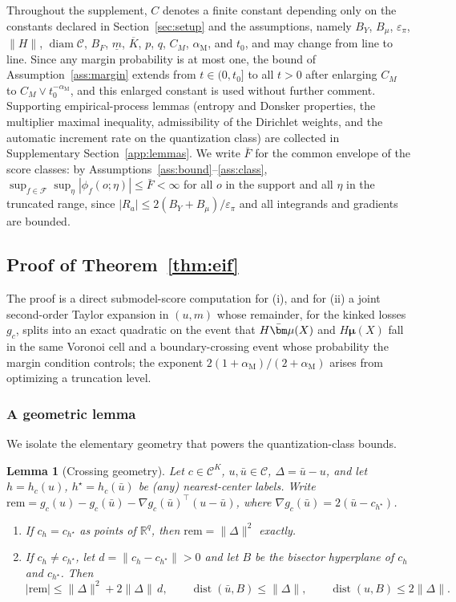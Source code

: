 \documentclass[11pt]{article}
\newtheorem{lemma}{Lemma}
\newcommand{\R}{\mathbb R}
\newcommand{\dist}{\operatorname{dist}}
\newcommand{\diam}{\operatorname{diam}}
\newcommand{\calC}{\mathcal C}
\newcommand{\calF}{\mathcal F}
\newcommand{\bmu}{\bm\mu}
\newcommand{\eps}{\varepsilon}
\newcommand{\norm}[1]{\lVert #1\rVert}
\newcommand{\am}{\alpha_{\mathrm M}}
\begin{document}
Throughout the supplement, $C$ denotes a finite constant depending only on the constants declared in Section~\ref{sec:setup} and the assumptions, namely $B_Y$, $B_\mu$, $\eps_\pi$, $\norm{H}$, $\diam\calC$, $B_F$, $\underline m$, $\overline K$, $p$, $q$, $C_M$, $\am$, and $t_0$, and may change from line to line. Since any margin probability is at most one, the bound of Assumption~\ref{ass:margin} extends from $t\in(0,t_0]$ to all $t>0$ after enlarging $C_M$ to $C_M\vee t_0^{-\am}$, and this enlarged constant is used without further comment. 
Supporting empirical-process lemmas (entropy and Donsker properties, the multiplier maximal inequality, admissibility of the Dirichlet weights, and the automatic increment rate on the quantization class) are collected in Supplementary Section~\ref{app:lemmas}. 
We write $\bar F$ for the common envelope of the score classes: by Assumptions~\ref{ass:bound}--\ref{ass:class}, $\sup_{f\in\calF}\sup_\eta|\phi_f(o;\eta)|\le\bar F<\infty$ for all $o$ in the support and all $\eta$ in the truncated range, since $|R_a|\le2(B_Y+B_\mu)/\eps_\pi$ and all integrands and gradients are bounded.

\subsection{Proof of Theorem~\ref{thm:eif}}\label{app:eif}
The proof is a direct submodel-score computation for (i), and for (ii) a joint second-order Taylor expansion in $(u,m)$ whose remainder, for the kinked losses $g_c$, splits into an exact quadratic on the event that $H\bar\bmu(X)$ and $H\bmu(X)$ fall in the same Voronoi cell and a boundary-crossing event whose probability the margin condition controls; the exponent $2(1+\am)/(2+\am)$ arises from optimizing a truncation level.
\subsubsection{A geometric lemma}
We isolate the elementary geometry that powers the quantization-class bounds.

\begin{lemma}[Crossing geometry]\label{lem:geometry}
Let $c\in\calC^K$, $u,\bar u\in\calC$, $\Delta=\bar u-u$, and let $h=h_c(u)$, $h^\star=h_c(\bar u)$ be (any) nearest-center labels. Write $\mathrm{rem}=g_c(u)-g_c(\bar u)-\nabla g_c(\bar u)^\top(u-\bar u)$, where $\nabla g_c(\bar u)=2(\bar u-c_{h^\star})$.
\begin{enumerate}[label=(\alph*),leftmargin=2em]
\item If $c_h=c_{h^\star}$ as points of $\R^q$, then $\mathrm{rem}=\norm{\Delta}^2$ exactly.
\item If $c_h\ne c_{h^\star}$, let $d=\norm{c_h-c_{h^\star}}>0$ and let $B$ be the bisector hyperplane of $c_h$ and $c_{h^\star}$. Then
\begin{equation*}
|\mathrm{rem}|\le\norm{\Delta}^2+2\norm{\Delta}\,d,
\qquad
\dist(\bar u,B)\le\norm{\Delta},
\qquad
\dist(u,B)\le2\norm{\Delta} .
\end{equation*}
\end{enumerate}
\end{lemma}
\end{document}
